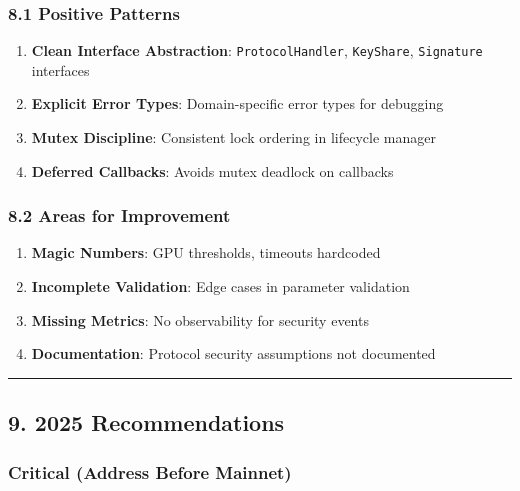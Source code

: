 \documentclass[
]{article}
\providecommand{\tightlist}{%
  \setlength{\itemsep}{0pt}\setlength{\parskip}{0pt}}
\begin{document}
\subsubsection{8.1 Positive Patterns}\label{81-positive-patterns}

\begin{enumerate}
\def\labelenumi{\arabic{enumi}.}
\tightlist
\item
  \textbf{Clean Interface Abstraction}: \texttt{ProtocolHandler},
  \texttt{KeyShare}, \texttt{Signature} interfaces
\item
  \textbf{Explicit Error Types}: Domain-specific error types for
  debugging
\item
  \textbf{Mutex Discipline}: Consistent lock ordering in lifecycle
  manager
\item
  \textbf{Deferred Callbacks}: Avoids mutex deadlock on callbacks
\end{enumerate}

\subsubsection{8.2 Areas for
Improvement}\label{82-areas-for-improvement}

\begin{enumerate}
\def\labelenumi{\arabic{enumi}.}
\tightlist
\item
  \textbf{Magic Numbers}: GPU thresholds, timeouts hardcoded
\item
  \textbf{Incomplete Validation}: Edge cases in parameter validation
\item
  \textbf{Missing Metrics}: No observability for security events
\item
  \textbf{Documentation}: Protocol security assumptions not documented
\end{enumerate}

\begin{center}\rule{0.5\linewidth}{0.5pt}\end{center}

\subsection{9. 2025 Recommendations}\label{9-2025-recommendations}

\subsubsection{Critical (Address Before
Mainnet)}\label{critical-address-before-mainnet}
\end{document}
